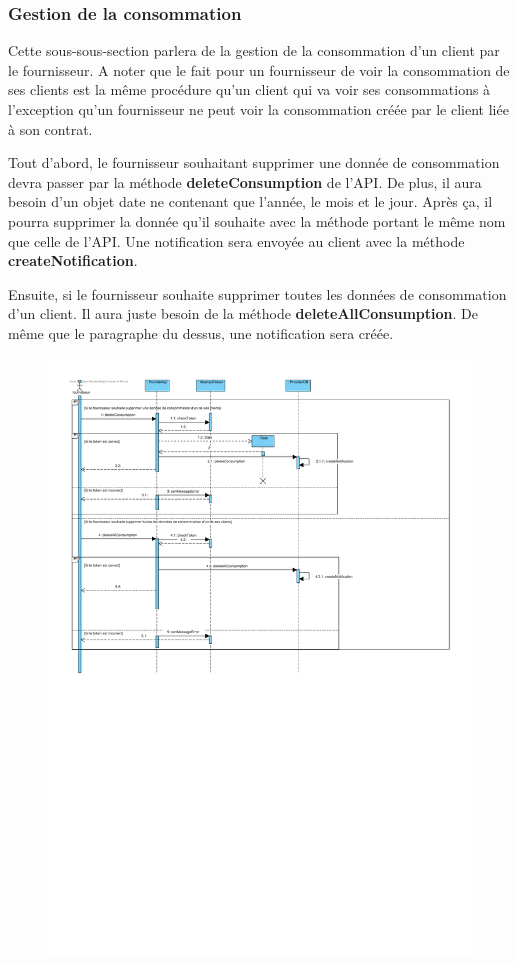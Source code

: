 \newpage
\subsubsection{Gestion de la consommation}
\begin{flushleft}
Cette sous-sous-section parlera de la gestion de la consommation d'un client par le fournisseur. A noter que le fait pour un fournisseur de voir la consommation de ses clients est la même procédure qu'un client qui va voir ses consommations à l'exception qu'un fournisseur ne peut voir la consommation créée par le client liée à son contrat.     
\end{flushleft}

\begin{flushleft}
Tout d'abord, le fournisseur souhaitant supprimer une donnée de consommation devra passer par la méthode \textbf{deleteConsumption} de l'API. De plus, il aura besoin d'un objet date ne contenant que l'année, le mois et le jour. Après ça, il pourra supprimer la donnée qu'il souhaite avec la méthode portant le même nom que celle de l'API. Une notification sera envoyée au client avec la méthode \textbf{createNotification}.
\end{flushleft}

\begin{flushleft}
Ensuite, si le fournisseur souhaite supprimer toutes les données de consommation d'un client. Il aura juste besoin de la méthode \textbf{deleteAllConsumption}. De même que le paragraphe du dessus, une notification sera créée.
\end{flushleft}

\begin{figure}[h]
    \centering
    \includegraphics[height = 0.8\textwidth]{Base/sequence/img/fournisseur/gestion de la consommation.pdf}
\end{figure}
